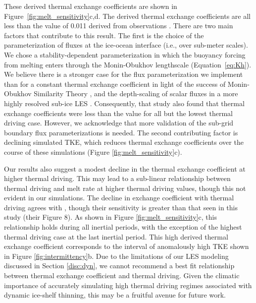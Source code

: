 \documentclass[draft]{agujournal2019}
\begin{document}
These derived thermal exchange coefficients are shown in Figure~\ref{fig:melt_sensitivity}c,d. The derived thermal exchange coefficients are all less than the value of 0.011 derived from observations \cite{jenkins_observation_2010}. There are two main factors that contribute to this result. The first is the choice of the parameterization of fluxes at the ice-ocean interface (i.e., over sub-meter scales). We chose a stability-dependent parameterization in which the buoyancy forcing from melting enters through the Monin-Obukhov lengthscale (Equation~\ref{eq:Kh}). We believe there is a stronger case for the flux parameterization we implement than for a constant thermal exchange coefficient in light of the success of Monin-Obukhov Similarity Theory \cite{monin_basic_1954, mcphee_air-ice-ocean_2008}, and the depth-scaling of scalar fluxes in a more highly resolved sub-ice LES \cite{vreugdenhil_stratification_2019}. Consequently, that study also found that thermal exchange coefficients were less than the  value for all but the lowest thermal driving case. However, we acknowledge that more validation of the sub-grid boundary flux parameterizations is needed. The second contributing factor is declining simulated TKE, which reduces thermal exchange coefficients over the course of these simulations (Figure \ref{fig:melt_sensitivity}c). 

Our results also suggest a modest decline in the thermal exchange coefficient at higher thermal driving. This may lead to a sub-linear relationship between thermal driving and melt rate at higher thermal driving values, though this not evident in our simulations. The decline in exchange coefficient with thermal driving agrees with , though their sensitivity is greater than that seen in this study (their Figure 8). As shown in Figure \ref{fig:melt_sensitivity}c, this relationship holds during all inertial periods, with the exception of the highest thermal driving case at the last inertial period. This high derived thermal exchange coefficient corresponds to the interval of anomalously high TKE shown in Figure \ref{fig:intermittency}b. Due to the limitations of our LES modeling discussed in Section \ref{disc:dyn}, we cannot recommend a best fit relationship between thermal exchange coefficient and thermal driving. Given the climatic importance of accurately simulating high thermal driving regimes associated with dynamic ice-shelf thinning, this may be a fruitful avenue for future work.
\end{document}
